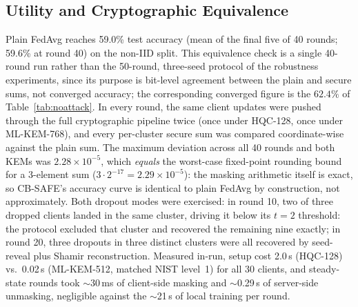 \documentclass[lettersize,journal]{IEEEtran}
\begin{document}
\subsection{Utility and Cryptographic Equivalence}
Plain FedAvg reaches 59.0\% test accuracy (mean of the final five of 40 rounds;
59.6\% at round 40) on the non-IID split. This equivalence check is a single
40-round run rather than the 50-round, three-seed protocol of the robustness
experiments, since its purpose is bit-level agreement between the plain and secure
sums, not converged accuracy; the corresponding converged figure is the
$62.4\%$ of Table~\ref{tab:noattack}. In every round,
the same client updates were pushed through the full cryptographic pipeline twice
(once under HQC-128, once under ML-KEM-768), and every per-cluster secure sum was
compared coordinate-wise against the plain sum. The maximum deviation across all 40
rounds and both KEMs was $2.28\times10^{-5}$, which \emph{equals} the worst-case
fixed-point rounding bound for a 3-element sum ($3\cdot 2^{-17}=2.29\times10^{-5}$):
the masking arithmetic itself is exact, so CB-SAFE's accuracy curve is identical to
plain FedAvg by construction, not approximately. Both dropout modes were exercised:
in round 10, two of three dropped clients landed in the same cluster, driving it
below its $t{=}2$ threshold: the protocol excluded that cluster and recovered the
remaining nine exactly; in round 20, three dropouts in three distinct clusters were
all recovered by seed-reveal plus Shamir reconstruction. Measured in-run, setup cost
2.0\,s (HQC-128) vs.\ 0.02\,s (ML-KEM-512, matched NIST level~1) for all 30 clients, and steady-state
rounds took $\sim$30\,ms of client-side masking and $\sim$0.29\,s of server-side
unmasking, negligible against the $\sim$21\,s of local training per round.
\end{document}
